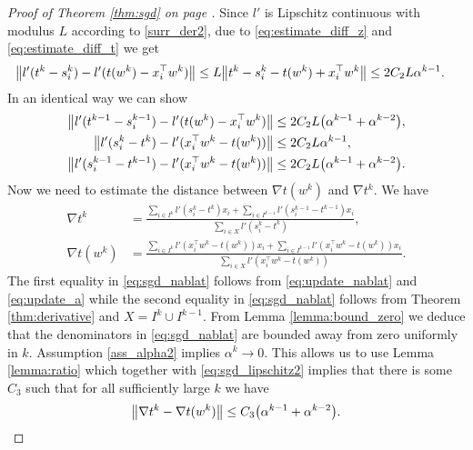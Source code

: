 \begin{proof}[Proof of Theorem \ref{thm:sgd} on page \pageref{thm:sgd}]
  Since $l'$ is Lipschitz continuous with modulus $L$ according to \ref{surr_der2}, due to \eqref{eq:estimate_diff_z} and \eqref{eq:estimate_diff_t} we get
  \begin{equation}\label{eq:sgd_lipschitz1}
    \begin{aligned}
      \nrm{l'(t^k-s_i^k) - l'(t(w^k)-x_i^\top w^k)}
      & \le L \nrm{t^k-s_i^k - t(w^k)+ x_i^\top w^k}
        \le  2C_2L\alpha^{k-1}.
    \end{aligned}
  \end{equation}
  In an identical way we can show
  \begin{equation}\label{eq:sgd_lipschitz2}
    \begin{aligned}
      \nrm{l'(t^{k-1}-s_i^{k-1}) - l'(t(w^k)-x_i^\top w^k)}
      & \le 2C_2L\Brac{\alpha^{k-1}+\alpha^{k-2}}, \\
      \nrm{l'(s_i^k-t^k) - l'(x_i^\top w^k-t(w^k))}
      & \le 2C_2L\alpha^{k-1}, \\
      \nrm{l'(s_i^{k-1}-t^{k-1}) - l'(x_i^\top w^k-t(w^k))}
      & \le 2C_2L\Brac{\alpha^{k-1}+\alpha^{k-2}}.
    \end{aligned}
  \end{equation}
  Now we need to estimate the distance between $\nabla t(w^k)$ and $\nabla t^k$. We have
  \begin{equation}\label{eq:sgd_nablat}
    \begin{aligned}
      \nabla t^k
      & = \frac{\sum_{i\in I^k}l'(s_i^k-t^k)x_i + \sum_{i\in I^{k-1}}l'(s_i^{k-1}-t^{k-1})x_i}{\sum_{i\in X}l'(s_i^k-t^k)}, \\
      \nabla t(w^k)
      & = \frac{\sum_{i\in I^k}l'(x_i^\top w^k-t(w^k))x_i + \sum_{i\in I^{k-1}}l'(x_i^\top w^k-t(w^k))x_i}{\sum_{i\in X}l'(x_i^\top w^k-t(w^k))}.
    \end{aligned}
  \end{equation}
  The first equality in \eqref{eq:sgd_nablat} follows from \eqref{eq:update_nablat} and \eqref{eq:update_a} while the second equality in \eqref{eq:sgd_nablat} follows from Theorem \ref{thm:derivative} and $X=I^k\cup I^{k-1}$. From Lemma \ref{lemma:bound_zero} we deduce that the denominators in \eqref{eq:sgd_nablat} are bounded away from zero uniformly in $k$. Assumption \ref{ass_alpha2} implies  $\alpha^k\to 0$. This allows us to use Lemma \ref{lemma:ratio} which together with \eqref{eq:sgd_lipschitz2} implies that there is some $C_3$ such that for all sufficiently large $k$ we have
  \begin{equation}\label{eq:sgd_nablat_diff}
    \norm{\nabla t^k - \nabla t(w^k)} \le C_3\Brac{\alpha^{k-1} + \alpha^{k-2}}.
  \end{equation}


\end{proof}
